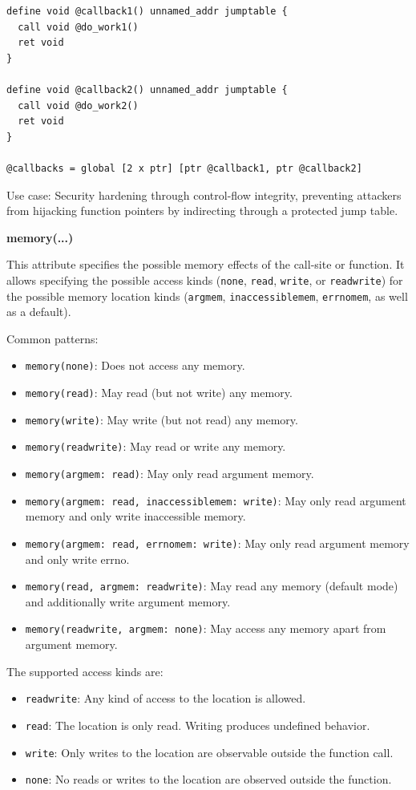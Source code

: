 \begin{lstlisting}[style=ir]
define void @callback1() unnamed_addr jumptable {
  call void @do_work1()
  ret void
}

define void @callback2() unnamed_addr jumptable {
  call void @do_work2()
  ret void
}

@callbacks = global [2 x ptr] [ptr @callback1, ptr @callback2]
\end{lstlisting}

Use case: Security hardening through control-flow integrity, preventing attackers from hijacking function pointers by indirecting through a protected jump table.

\textbf{memory(...)}

This attribute specifies the possible memory effects of the call-site or function.
It allows specifying the possible access kinds (\texttt{none}, \texttt{read}, \texttt{write}, or \texttt{readwrite}) for the possible memory location kinds (\texttt{argmem}, \texttt{inaccessiblemem}, \texttt{errnomem}, as well as a default).

Common patterns:

\begin{itemize}[noitemsep]
  \item \texttt{memory(none)}: Does not access any memory.
  \item \texttt{memory(read)}: May read (but not write) any memory.
  \item \texttt{memory(write)}: May write (but not read) any memory.
  \item \texttt{memory(readwrite)}: May read or write any memory.
  \item \texttt{memory(argmem: read)}: May only read argument memory.
  \item \texttt{memory(argmem: read, inaccessiblemem: write)}: May only read argument memory and only write inaccessible memory.
  \item \texttt{memory(argmem: read, errnomem: write)}: May only read argument memory and only write errno.
  \item \texttt{memory(read, argmem: readwrite)}: May read any memory (default mode) and additionally write argument memory.
  \item \texttt{memory(readwrite, argmem: none)}: May access any memory apart from argument memory.
\end{itemize}

The supported access kinds are:

\begin{itemize}[noitemsep]
  \item \texttt{readwrite}: Any kind of access to the location is allowed.
  \item \texttt{read}: The location is only read. Writing produces undefined behavior.
  \item \texttt{write}: Only writes to the location are observable outside the function call.
  \item \texttt{none}: No reads or writes to the location are observed outside the function.
\end{itemize}

